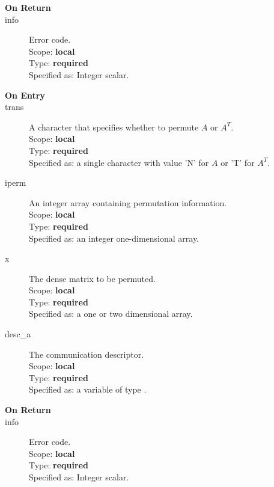 \begin{description}
\item[\bf On Return]
\item[info] Error code.\\
Scope: {\bf local} \\
Type: {\bf required}\\
Specified as: Integer scalar.\\
\end{description}


%
%


\begin{description}
\item[\bf On Entry]
\item[trans] A character that specifies whether to permute $A$  or $A^T$.\\
Scope: {\bf local} \\
Type: {\bf required}\\
Specified as: a single character with value 'N' for $A$ or 'T' for $A^T$.\\
\item[iperm] An integer array containing permutation information.\\
Scope: {\bf local} \\
Type: {\bf required}\\
Specified as: an integer one-dimensional array.\\
\item[x] The dense matrix to be permuted.\\
Scope: {\bf local} \\
Type: {\bf required}\\
Specified as: a one or two dimensional array.\\
\item[desc\_a] The communication descriptor.\\
Scope: {\bf local} \\
Type: {\bf required}\\
Specified as: a variable of type \descdata.\\
\end{description}

\begin{description}
\item[\bf On Return]
\item[info] Error code.\\
Scope: {\bf local} \\
Type: {\bf required}\\
Specified as: Integer scalar.\\
\end{description}


